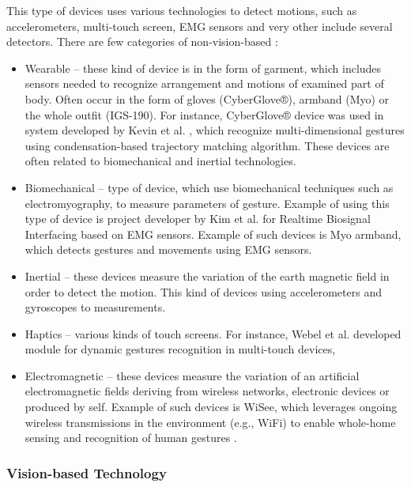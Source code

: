 This type of devices uses various technologies to detect motions, such as accelerometers, multi-touch screen, EMG sensors and very other include several detectors. There are few categories of non-vision-based \cite{kaaniche2009human}:
\begin{itemize}
\item Wearable -- these kind of device is in the form of garment, which includes sensors needed to recognize arrangement and motions of examined part of body. Often occur in the form of gloves (CyberGlove®), armband (Myo) or the whole outfit (IGS-190). For instance, CyberGlove® device was used in system developed by Kevin et al. \cite{KevinCyberGloves}, which recognize multi-dimensional gestures using condensation-based trajectory matching algorithm. These devices are often related to biomechanical and inertial technologies. 
\item Biomechanical -- type of device, which use biomechanical techniques such as electromyography, to measure parameters of gesture. Example of using this type of device is project developer by Kim et al. \cite{Kim:2008:EHG:1378773.1378778} for Realtime Biosignal Interfacing based on EMG sensors. Example of such devices is Myo armband, which detects gestures and movements using EMG sensors. 
\item Inertial -- these devices measure the variation of the earth magnetic field in order to detect the motion. This kind of devices using accelerometers\cite{LiuAccelerometer} and gyroscopes \cite{TUD-CS-2009-0292} to measurements.
\item Haptics -- various kinds of touch screens. For instance, Webel et al.\cite{conf/vrst/WebelKZ08} developed module for dynamic gestures recognition in multi-touch devices,
\item Electromagnetic -- these devices measure the variation of an artificial electromagnetic fields deriving from wireless networks, electronic devices or produced by self. Example of such devices is WiSee, which leverages ongoing wireless transmissions in the environment (e.g., WiFi) to enable whole-home sensing and recognition of human gestures \cite{Pu:2013:WGR:2500423.2500436}.
\end{itemize}

\subsubsection{Vision-based Technology}


